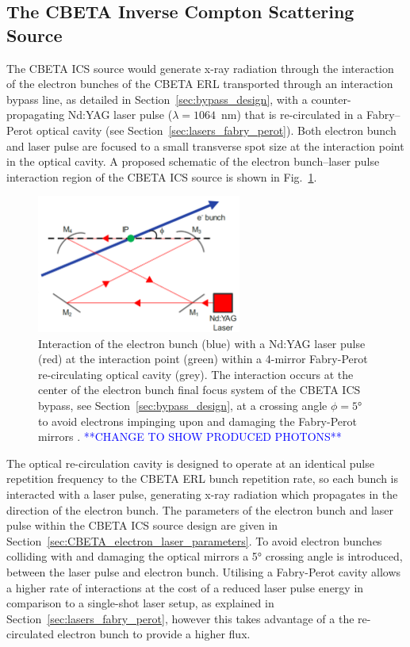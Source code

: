 \documentclass[../main.tex]{subfiles}
\begin{document}
\subsection{The CBETA Inverse Compton Scattering Source}
\label{sec:CBETA_ICS_source_description}

The CBETA ICS source would generate x-ray radiation through the interaction of the electron bunches of the CBETA ERL transported through an interaction bypass line, as detailed in Section~\ref{sec:bypass_design}, with a counter-propagating Nd:YAG laser pulse ($\lambda=1064$~\si{\nano\meter}) that is re-circulated in a Fabry--Perot optical cavity (see Section~\ref{sec:lasers_fabry_perot}). Both electron bunch and laser pulse are focused to a small transverse spot size at the interaction point in the optical cavity. A proposed schematic of the electron bunch--laser pulse interaction region of the CBETA ICS source is shown in Fig.~\ref{fig:CBETA_ICS_Interaction}. 
\begin{figure}[!h]
\centering
\includegraphics[width=0.6\textwidth]{Figures/CBETA_Inverse_Compton_Source_Design/CBETA_ICS_Interaction_fixed.pdf}
\caption{Interaction of the electron bunch (blue) with a Nd:YAG laser pulse (red) at the interaction point (green) within a 4-mirror Fabry-Perot re-circulating optical cavity (grey). The interaction occurs at the center of the electron bunch final focus system of the CBETA ICS bypass, see Section~\ref{sec:bypass_design}, at a crossing angle $\phi=5$\si{\degree} to avoid electrons impinging upon and damaging the Fabry-Perot mirrors \cite{variola2011luminosity}. \textcolor{blue}{**CHANGE TO SHOW PRODUCED PHOTONS**}}
\label{fig:CBETA_ICS_Interaction}
\end{figure}
The optical re-circulation cavity is designed to operate at an identical pulse repetition frequency to the CBETA ERL bunch repetition rate, so each bunch is interacted with a laser pulse, generating x-ray radiation which propagates in the direction of the electron bunch. The parameters of the electron bunch and laser pulse within the CBETA ICS source design are given in Section~\ref{sec:CBETA_electron_laser_parameters}. To avoid electron bunches colliding with and damaging the optical mirrors \cite{variola2011luminosity} a 5\si{\degree} crossing angle is introduced, between the laser pulse and electron bunch. Utilising a Fabry-Perot cavity allows a higher rate of interactions at the cost of a reduced laser pulse energy in comparison to a single-shot laser setup, as explained in Section~\ref{sec:lasers_fabry_perot}, however this takes advantage of a the re-circulated electron bunch to provide a higher flux.
\end{document}
